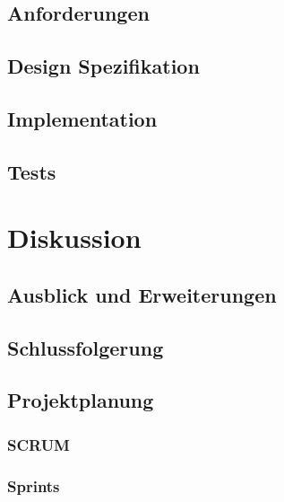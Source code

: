 \documentclass[a4paper,twopage,ngerman,11pt]{scrreprt}
\begin{document}
		\chapter{Anforderungen}
		\chapter{Design Spezifikation}
		\chapter{Implementation}
		\chapter{Tests}

	\part{Diskussion}
		\chapter{Ausblick und Erweiterungen}
		\chapter{Schlussfolgerung}


	\makeglossaries

	
	{}
	

	\chapter{Projektplanung}
		\section{SCRUM}
		\section{Sprints}
\end{document}
